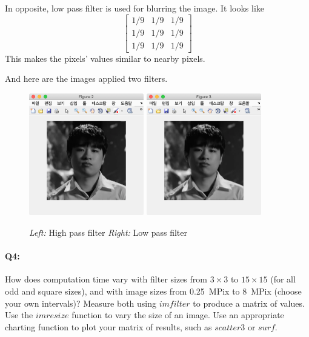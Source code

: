 	In opposite, low pass filter is used for blurring the image. It looks like 
	\begin{equation*}
		\begin{bmatrix}
			1/9 & 1/9 & 1/9 \\
			1/9 & 1/9 & 1/9 \\
			1/9 & 1/9 & 1/9
		\end{bmatrix}
	\end{equation*}
	This makes the pixels' values similar to nearby pixels.

	And here are the images applied two filters.
	
	\begin{figure}[h]
		\centering
		\includegraphics[width=5cm]{maru_high.png}
		\includegraphics[width=5cm]{maru_low.png}
		\caption{\emph{Left:} High pass filter \emph{Right:} Low pass filter}
		\label{fig:high and low filter}
	\end{figure}
	
	
	\pagebreak
	\paragraph{Q4:} How does computation time vary with filter sizes from $3\times3$ to $15\times15$ (for all odd and square sizes), and with image sizes from 0.25~MPix to 8~MPix (choose your own intervals)? Measure both using \href{https://www.mathworks.com/help/images/ref/imfilter.html}{$imfilter$} to produce a matrix of values. Use the \href{https://www.mathworks.com/help/images/ref/imresize.html}{$imresize$} function to vary the size of an image. Use an appropriate charting function to plot your matrix of results, such as \href{https://www.mathworks.com/help/matlab/ref/scatter3.html}{$scatter3$} or \href{https://www.mathworks.com/help/matlab/ref/surf.html}{$surf$}.
	
